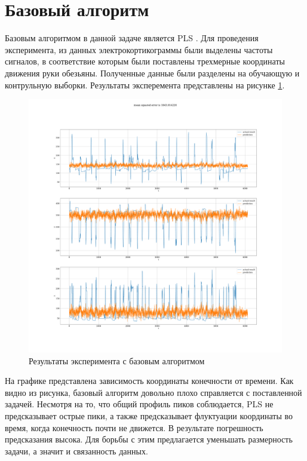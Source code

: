 \section{Базовый алгоритм}
Базовым алгоритмом в данной задаче является PLS \cite{Haenlein2004}. Для проведения эксперимента, из данных электрокортикограммы были выделены частоты сигналов, в соответствие которым были поставлены трехмерные координаты движения руки обезьяны. Полученные данные были разделены на обучающую и контрульную выборки. Результаты эксперемента представлены на рисунке \ref{fig:baseAlgo}.
\begin{figure}
  \begin{center}
    \includegraphics[width=\textwidth]{pls.pdf}
    \caption{Результаты эксперимента с базовым алгоритмом}
    \label{fig:baseAlgo}
  \end{center}
\end{figure}
На графике представлена зависимость координаты конечности от времени. Как видно из рисунка, базовый алгоритм довольно плохо справляется с поставленной задачей. Несмотря на то, что общий профиль пиков соблюдается, PLS не предсказывает острые пики, а также предсказывает флуктуации координаты во время, когда конечность почти не движется. В результате погрешность предсказания высока. Для борьбы с этим предлагается уменьшать размерность задачи, а значит и связанность данных.
